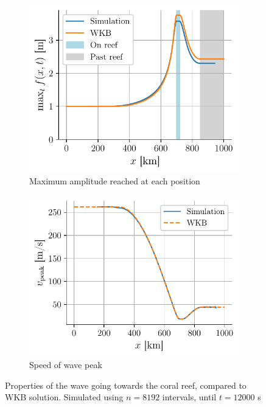 \begin{figure}[h]
    \centering
    \begin{subfigure}{0.48\linewidth}
        \centering
        \includegraphics[width=\linewidth]{figures/corail_eq1_amplitude_wkb.pdf}
        \caption{Maximum amplitude reached at each position}
        \label{fig:corail_eq1_amplitude}
    \end{subfigure}
    \begin{subfigure}{0.48\linewidth}
        \centering
        \includegraphics[width=\linewidth]{figures/corail_eq1_vitesse_wkb.pdf}
        \caption{Speed of wave peak}
        \label{fig:corail_eq1_vitesse}
    \end{subfigure}
    \caption{Properties of the wave going towards the coral reef, compared to WKB solution. Simulated using \(n=8192\) intervals, until \(t=12000\) \si{\second}}
    \label{fig:corail_eq1_properties}
\end{figure}

